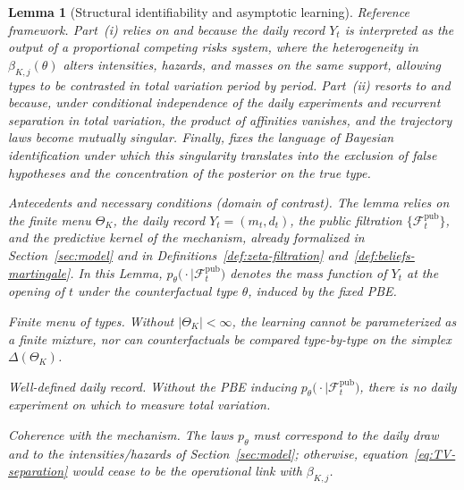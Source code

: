 \documentclass[review,authoryear,12pt]{elsarticle}
\theoremstyle{plain}
\newtheorem{lemma}[theorem]{Lemma}
\theoremstyle{definition}
\newcommand{\ThetaK}{\Theta_K}
\newcommand{\1}{\mathbf{1}}
\begin{document}
\begin{lemma}[Structural identifiability and asymptotic learning]\label{lem:hazard-separation}
\normalfont
Reference framework. Part~\textup{(i)} relies on \citet{Cox1972} and \citet{Bradburn2003} because the daily record $Y_t$ is interpreted as the output of a proportional competing risks system, where the heterogeneity in $\beta_{K,j}(\theta)$ alters intensities, hazards, and masses on the same support, allowing types to be contrasted in total variation period by period. Part~\textup{(ii)} resorts to \citet{Kakutani1948} and \citet{Shiryaev2019Probability} because, under conditional independence of the daily experiments and recurrent separation in total variation, the product of affinities vanishes, and the trajectory laws become mutually singular. Finally, \citet{Schervish1995Theory} fixes the language of Bayesian identification under which this singularity translates into the exclusion of false hypotheses and the concentration of the posterior on the true type.

\medskip
\noindent Antecedents and necessary conditions \textup{(}domain of contrast\textup{)}.
The lemma relies on the finite menu $\ThetaK$, the daily record $Y_t=(m_t,d_t)$, the public filtration $\{\mathcal{F}_t^{\mathrm{pub}}\}$, and the predictive kernel of the mechanism, already formalized in Section~\ref{sec:model} and in Definitions~\ref{def:zeta-filtration} and~\ref{def:beliefs-martingale}. In this Lemma, $p_\theta\bigl(\cdot\mid \mathcal{F}_t^{\mathrm{pub}}\bigr)$ denotes the mass function of $Y_t$ at the opening of $t$ under the counterfactual type $\theta$, induced by the fixed PBE.
\begin{list}{}{%
  \setlength{\leftmargin}{2.25em}%
  \setlength{\labelwidth}{2.25em}%
  \setlength{\labelsep}{0.45em}%
  \setlength{\itemsep}{0.35em}%
  \setlength{\parsep}{0pt}%
  \setlength{\topsep}{0.25em}%
}
\item[\textup{(N1)}] \textup{Finite menu of types.}\quad
Without $\lvert\ThetaK\rvert<\infty$, the learning cannot be parameterized as a finite mixture, nor can counterfactuals be compared type-by-type on the simplex $\Delta(\ThetaK)$.
\item[\textup{(N2)}] \textup{Well-defined daily record.}\quad
Without the PBE inducing $p_\theta\bigl(\cdot\mid\mathcal{F}_t^{\mathrm{pub}}\bigr)$, there is no daily experiment on which to measure total variation.
\item[\textup{(N3)}] \textup{Coherence with the mechanism.}\quad
The laws $p_\theta$ must correspond to the daily draw and to the intensities/hazards of Section~\ref{sec:model}; otherwise, equation~\eqref{eq:TV-separation} would cease to be the operational link with $\beta_{K,j}$.
\end{list}


\end{lemma}
\end{document}
